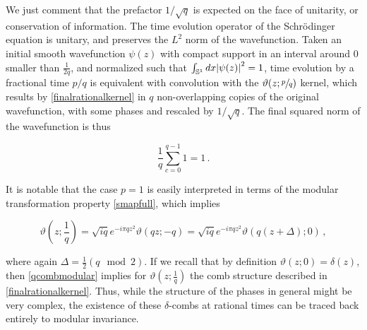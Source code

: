 \documentclass{article}
\newcommand{\T}{\ensuremath{\vartheta}}
\newcommand{\sumZ}{\sum_{n=-\infty}^{\infty}}
\begin{document}
We just comment that the prefactor $1/\sqrt{q}$ is expected on the face of unitarity, or conservation of information. The time evolution operator of the Schr\"odinger equation is unitary, and preserves the $L^2$ norm of the wavefunction. Taken an initial smooth wavefunction $\psi(z)$ with compact support in an interval around $0$ smaller than $\frac{1}{2q}$, and normalized such that $\int_{\mathbb{S}^1} dx \abs{\psi(z)}^2 = 1$, time evolution by a fractional time $p/q$ is equivalent with convolution with the $\vartheta(z;\sfrac{p}{q})$ kernel, which results by \eqref{finalrationalkernel} in $q$ non-overlapping copies of the original wavefunction, with some phases and rescaled by $1/\sqrt{q}$. The final squared norm of the wavefunction is thus

\begin{equation}
    \frac{1}{q}\sum_{c=0}^{q-1} 1 = 1\,.
\end{equation}

It is notable that the case $p = 1$ is easily interpreted in terms of the modular transformation property \eqref{smapfull}, which implies

\begin{equation}\label{qcombmodular}
    \vartheta\left(z;\frac{1}{q}\right) = \sqrt{iq} e^{-i\pi q z^2} \T(qz;-q) = \sqrt{iq} e^{-i\pi q z^2} \T(q(z+\Delta);0)\,,
\end{equation}

where again $\Delta = \frac{1}{2} (q \mod 2)$. If we recall that by definition $\T(z;0) = \delta(z)$, then \eqref{qcombmodular} implies for $\T(z;\frac{1}{q})$ the comb structure described in \eqref{finalrationalkernel}. Thus, while the structure of the phases in general might be very complex, the existence of these $\delta$-combs at rational times can be traced back entirely to modular invariance.

%
%
%
%
%
\end{document}
